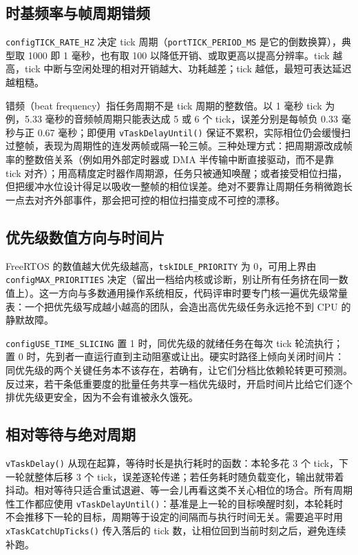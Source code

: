 \documentclass[12pt,a4paper,fontset=fandol]{ctexbook}
\newcommand{\Fn}[1]{\texttt{#1()}}
\newcommand{\Tp}[1]{\texttt{#1}}
\newcommand{\Bk}{\discretionary{}{}{}}
\begin{document}
\subsection{时基频率与帧周期错频}

\Tp{configTICK\_RATE\_HZ} 决定 tick 周期（\Tp{portTICK\_PERIOD\_MS} 是它的倒数换算），典型取 1000 即 1 毫秒，也有取 100 以降低开销、或取更高以提高分辨率。tick 越高，tick 中断与空闲处理的相对开销越大、功耗越差；tick 越低，最短可表达延迟越粗糙。

错频（beat frequency）指任务周期不是 tick 周期的整数倍。以 1 毫秒 tick 为例，5.33 毫秒的音频帧周期只能表达成 5 或 6 个 tick，误差分别是每帧负 0.33 毫秒与正 0.67 毫秒；即便用 \Fn{vTaskDelayUntil} 保证不累积，实际相位仍会缓慢扫过整帧，表现为周期性的连发两帧或隔一轮三帧。三种处理方式：把周期源改成帧率的整数倍关系（例如用外部定时器或 DMA 半传输中断直接驱动，而不是靠 tick 对齐）；用高精度定时器作周期源，任务只被通知唤醒；或者接受相位扫描，但把缓冲水位设计得足以吸收一整帧的相位误差。绝对不要靠让周期任务稍微跑长一点去对齐外部事件，那会把可控的相位扫描变成不可控的漂移。

\subsection{优先级数值方向与时间片}

FreeRTOS 的数值越大优先级越高，\Tp{tskIDLE\_{\Bk}PRIORITY} 为 0，可用上界由 \Tp{configMAX\_{\Bk}PRIORITIES} 决定（留出一档给内核或诊断，别让所有任务挤在同一数值上）。这一方向与多数通用操作系统相反，代码评审时要专门核一遍优先级常量表：一个把优先级写成越小越高的团队，会造出高优先级任务永远抢不到 CPU 的静默故障。

\Tp{configUSE\_TIME\_SLICING} 置 1 时，同优先级的就绪任务在每次 tick 轮流执行；置 0 时，先到者一直运行直到主动阻塞或让出。硬实时路径上倾向关闭时间片：同优先级的两个关键任务本不该存在，若确有，让它们分档比依赖轮转更可预测。反过来，若干条低重要度的批量任务共享一档优先级时，开启时间片比给它们逐个排优先级更安全，因为不会有谁被永久饿死。

\subsection{相对等待与绝对周期}

\Fn{vTaskDelay} 从现在起算，等待时长是执行耗时的函数：本轮多花 3 个 tick，下一轮就整体后移 3 个 tick，误差逐轮传递；若任务耗时随负载变化，输出就带着抖动。相对等待只适合重试退避、等一会儿再看这类不关心相位的场合。所有周期性工作都应使用 \Fn{vTaskDelayUntil}：基准是上一轮的目标唤醒时刻，本轮耗时不会推移下一轮的目标，周期等于设定的间隔而与执行时间无关。需要追平时用 \Fn{xTaskCatchUpTicks} 传入落后的 tick 数，让相位回到当前时刻之后，避免连续补跑。
\end{document}
